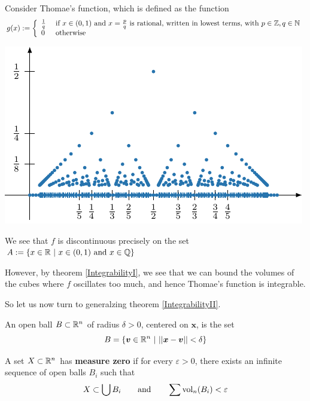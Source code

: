     \begin{example}\label{Thomae}
    Consider Thomae's function, which is defined as the function $$g(x) := \left\{
		\begin{array}{ll}
			\frac{1}{q} & \text{ if } x \in (0,1) \text{ and }  x =\frac{p}{q} \text{ is rational, written in lowest terms, with } p \in \mathbb{Z}, q \in \mathbb{N} \\
			0 & \text{ otherwise}
		\end{array}
		\right.$$


\begin{center}
\includegraphics{chapters/4-IntegrationRn/figures/figures-thomaesfunction.pdf}
\end{center}
  

    We see that $f$ is discontinuous precisely on the set $A := \{ x \in \mathbb{R} \ | \ x \in (0,1) \text{ and }  x \in \mathbb{Q} \}$

    However, by theorem \ref{IntegrabilityI}, we see that we can bound the volumes of the cubes where $f$ oscillates too much, and hence Thomae's function is integrable.
    
    \end{example}

So let us now turn to generalzing theorem \ref{IntegrabilityII}.

\begin{definition}
        An open ball $B \subset \mathbb{R}^n$ of radius $\delta > 0$, centered on $\bm{x}$, is the set
        $$B = \left\{ \bm{v} \in \mathbb{R}^n \ | \ ||\bm{x} - \bm{v}|| < \delta \right\}$$
    \end{definition}

\begin{definition}
        A set $X \subset \mathbb{R}^n$ has \textbf{measure zero} if for every $\varepsilon > 0$, there exists an infinite sequence of open balls $B_i$ such that 
    $$X \subset \bigcup B_i \qquad \textnormal{and} \qquad \sum \text{vol}_n(B_i) < \varepsilon$$
    \end{definition}

